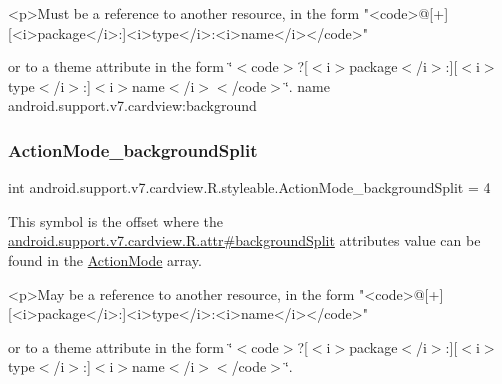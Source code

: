 \begin{DoxyVerb}      <p>Must be a reference to another resource, in the form "<code>@[+][<i>package</i>:]<i>type</i>:<i>name</i></code>"
\end{DoxyVerb}
 or to a theme attribute in the form \char`\"{}$<$code$>$?\mbox{[}$<$i$>$package$<$/i$>$\+:\mbox{]}\mbox{[}$<$i$>$type$<$/i$>$\+:\mbox{]}$<$i$>$name$<$/i$>$$<$/code$>$\char`\"{}.  name android.\+support.\+v7.\+cardview\+:background \mbox{\label{classandroid_1_1support_1_1v7_1_1cardview_1_1R_1_1styleable_a1ff81fea394e8d3fc2d0bac1f401a6b3}} 
\subsubsection{\texorpdfstring{Action\+Mode\+\_\+background\+Split}{ActionMode\_backgroundSplit}}
{\footnotesize\ttfamily int android.\+support.\+v7.\+cardview.\+R.\+styleable.\+Action\+Mode\+\_\+background\+Split = 4\hspace{0.3cm}{\ttfamily [static]}}

This symbol is the offset where the \hyperlink{classandroid_1_1support_1_1v7_1_1cardview_1_1R_1_1attr_afaa578ea45659f58ba2319e9ff85da78}{android.\+support.\+v7.\+cardview.\+R.\+attr\#background\+Split} attribute\textquotesingle{}s value can be found in the \hyperlink{classandroid_1_1support_1_1v7_1_1cardview_1_1R_1_1styleable_aadab2db6f0b961c9bad3b28abb49a9b0}{Action\+Mode} array.

\begin{DoxyVerb}      <p>May be a reference to another resource, in the form "<code>@[+][<i>package</i>:]<i>type</i>:<i>name</i></code>"
\end{DoxyVerb}
 or to a theme attribute in the form \char`\"{}$<$code$>$?\mbox{[}$<$i$>$package$<$/i$>$\+:\mbox{]}\mbox{[}$<$i$>$type$<$/i$>$\+:\mbox{]}$<$i$>$name$<$/i$>$$<$/code$>$\char`\"{}. 

